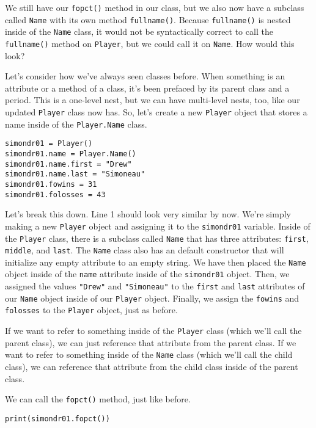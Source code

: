 We still have our \verb|fopct()| method in our class, but we also now have a subclass called \verb|Name| with its own method \verb|fullname()|. Because \verb|fullname()| is nested inside of the \verb|Name| class, it would not be syntactically correct to call the \verb|fullname()| method on \verb|Player|, but we could call it on \verb|Name|. How would this look?\par
Let's consider how we've always seen classes before. When something is an attribute or a method of a class, it's been prefaced by its parent class and a period. This is a one-level nest, but we can have multi-level nests, too, like our updated \verb|Player| class now has. So, let's create a new \verb|Player| object that stores a name inside of the \verb|Player.Name| class.\par
\begin{lstlisting}[style=pippython]
simondr01 = Player()
simondr01.name = Player.Name()
simondr01.name.first = "Drew"
simondr01.name.last = "Simoneau"
simondr01.fowins = 31
simondr01.folosses = 43
\end{lstlisting}
Let's break this down. Line 1 should look very similar by now. We're simply making a new \verb|Player| object and assigning it to the \verb|simondr01| variable. Inside of the \verb|Player| class, there is a subclass called \verb|Name| that has three attributes: \verb|first|, \verb|middle|, and \verb|last|. The \verb|Name| class also has an default constructor that will initialize any empty attribute to an empty string. We have then placed the \verb|Name| object inside of the \verb|name| attribute inside of the \verb|simondr01| object. Then, we assigned the values \verb|"Drew"| and \verb|"Simoneau"| to the \verb|first| and \verb|last| attributes of our \verb|Name| object inside of our \verb|Player| object. Finally, we assign the \verb|fowins| and \verb|folosses| to the \verb|Player| object, just as before.\par
If we want to refer to something inside of the \verb|Player| class (which we'll call the parent class), we can just reference that attribute from the parent class. If we want to refer to something inside of the \verb|Name| class (which we'll call the child class), we can reference that attribute from the child class inside of the parent class.\par
We can call the \verb|fopct()| method, just like before.\par
\begin{lstlisting}[style=pippython]
print(simondr01.fopct())
\end{lstlisting}
